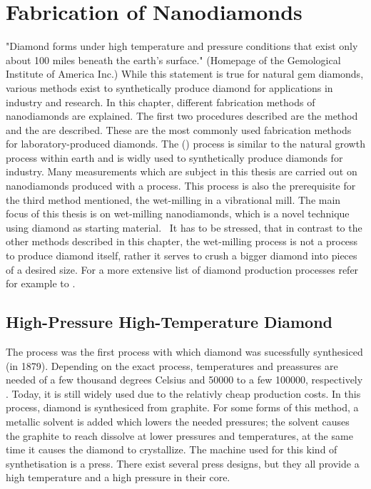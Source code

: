 
\chapter{Fabrication of Nanodiamonds}	\label{ch::fabrication_nanodiamonds}

	"Diamond forms under high temperature and pressure conditions that exist only about 100 miles beneath the earth’s surface." (Homepage of the Gemological Institute of America Inc.)
	While this statement is true for natural gem diamonds, various methods exist to synthetically produce diamond for applications in industry and research. 
	In this chapter, different fabrication methods of nanodiamonds are explained.
	The first two procedures described are the \hpht method and the \cvd are described.
	These are the most commonly used fabrication methods for laboratory-produced diamonds. 
	The \hpht (\HPHT) process is similar to the natural growth process within earth and is widly used to synthetically produce diamonds for industry.
	Many measurements which are subject in this thesis are carried out on nanodiamonds produced with a \CVD process. 
	This process is also the prerequisite for the third method mentioned, the wet-milling in a vibrational mill.
	The main focus of this thesis is on wet-milling nanodiamonds, which is a novel technique using \cvd diamond as starting material. 
	It has to be stressed, that in contrast to the other methods described in this chapter, the wet-milling process is not a process to produce diamond itself, rather it serves to crush a bigger diamond into pieces of  a desired size.
	For a more extensive list of diamond production processes refer for example to \cite{davis1993diamond}.

	

	\section{High-Pressure High-Temperature Diamond}

	The \HPHT process was the first process with which diamond was sucessfully synthesiced (in 1879).
	Depending on the exact process, temperatures and preassures are needed of a few thousand degrees Celsius and  \num{50000} to a few \num{100000}, respectively \cite{davis1993diamond}.
	Today, it is still widely used due to the relativly cheap production costs\cite{wikiSyntheticDiamond}.
	In this process, diamond is synthesiced from graphite.
	For some forms of this method, a metallic solvent is added which lowers the needed pressures; the solvent causes the graphite to reach dissolve at lower pressures and temperatures, at the same time it causes the diamond to crystallize.
	The machine used for this kind of synthetisation is a press.
	There exist several press designs, but they all provide a high temperature and a high pressure in their core.


